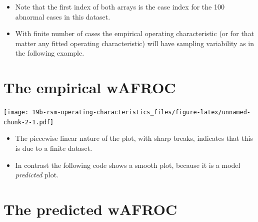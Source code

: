 \documentclass[
]{book}
\newenvironment{Shaded}{\begin{snugshade}}{\end{snugshade}}
\newcommand{\AttributeTok}[1]{\textcolor[rgb]{0.77,0.63,0.00}{#1}}
\newcommand{\FunctionTok}[1]{\textcolor[rgb]{0.00,0.00,0.00}{#1}}
\newcommand{\NormalTok}[1]{#1}
\newcommand{\OtherTok}[1]{\textcolor[rgb]{0.56,0.35,0.01}{#1}}
\newcommand{\SpecialCharTok}[1]{\textcolor[rgb]{0.00,0.00,0.00}{#1}}
\newcommand{\StringTok}[1]{\textcolor[rgb]{0.31,0.60,0.02}{#1}}
\providecommand{\tightlist}{%
  \setlength{\itemsep}{0pt}\setlength{\parskip}{0pt}}
\begin{document}
\begin{itemize}
\tightlist
\item
  Note that the first index of both arrays is the case index for the 100 abnormal cases in this dataset.
\item
  With finite number of cases the empirical operating characteristic (or for that matter any fitted operating characteristic) will have sampling variability as in the following example.
\end{itemize}

\hypertarget{the-empirical-wafroc}{%
\section{The empirical wAFROC}\label{the-empirical-wafroc}}

\begin{Shaded}
\end{Shaded}

\texttt{[image: 19b-rsm-operating-characteristics\_files/figure-latex/unnamed-chunk-2-1.pdf]}

\begin{itemize}
\tightlist
\item
  The piecewise linear nature of the plot, with sharp breaks, indicates that this is due to a finite dataset.
\item
  In contrast the following code shows a smooth plot, because it is a model \emph{predicted} plot.
\end{itemize}

\hypertarget{the-predicted-wafroc}{%
\section{The predicted wAFROC}\label{the-predicted-wafroc}}
\end{document}
